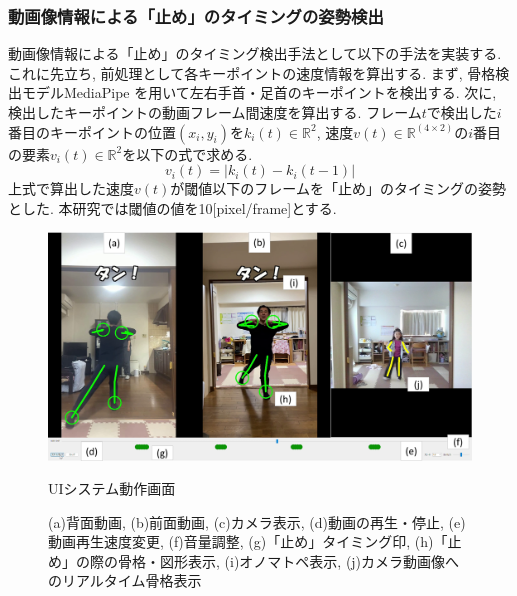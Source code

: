 \documentclass[technicalreport]{ieicej}
\begin{document}
\subsubsection{動画像情報による「止め」のタイミングの姿勢検出}
動画像情報による「止め」のタイミング検出手法として以下の手法を実装する. これに先立ち, 前処理として各キーポイントの速度情報を算出する. まず, 骨格検出モデルMediaPipe \cite{ref24}を用いて左右手首・足首のキーポイントを検出する. 次に, 検出したキーポイントの動画フレーム間速度を算出する. フレーム$t$で検出した$i$番目のキーポイントの位置$(x_{i},y_{i})$を$k_{i}(t)\in\mathbb{R}^2$, 速度$v(t)\in\mathbb{R}^{(4 \times 2)}$の$i$番目の要素$v_{i}(t)\in\mathbb{R}^2$を以下の式で求める. 
\begin{equation}
  v_{i} (t)=|k_{i}(t)-k_{i}(t-1)|
\end{equation}
上式で算出した速度$v(t)$が閾値以下のフレームを「止め」のタイミングの姿勢とした. 本研究では閾値の値を10[pixel/frame]とする. 
\begin{figure}[t]
  \centering
  \includegraphics[width=\linewidth]{./images/UI_system_ui2.png}
  \caption{UIシステム動作画面}
  \caption*{\footnotesize (a)背面動画, (b)前面動画, (c)カメラ表示, 
             (d)動画の再生・停止, (e)動画再生速度変更, (f)音量調整, 
             (g)「止め」タイミング印, (h)「止め」の際の骨格・図形表示, 
             (i)オノマトペ表示, (j)カメラ動画像へのリアルタイム骨格表示}
  \vspace{-2.0ex} %
\end{figure}
\end{document}
